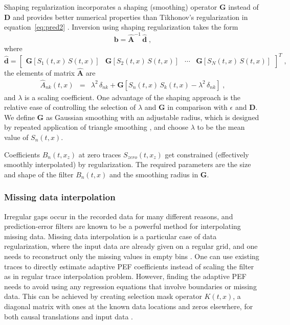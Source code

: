 Shaping regularization \cite[]{Fomel07} incorporates a shaping
(smoothing) operator $\mathbf{G}$ instead of $\mathbf{D}$ and
provides better numerical properties than Tikhonov's
regularization \cite[]{Tikhonov63} in
equation~\ref{eq:pred2} \cite[]{Fomel09}.
Inversion using shaping regularization takes the form
\begin{equation}
  \label{eq:rinv}
  \mathbf{b} = \widehat{\mathbf{A}}^{-1}\,\widehat{\mathbf{d}}\;,
\end{equation}
where 
\begin{equation}
  \label{eq:dvar2}
\widehat{\mathbf{d}} = \left[\begin{array}{cccc}\mathbf{G}\left[S_1(t,x)\,S(t,x)\right] & 
\mathbf{G}\left[S_2(t,x)\,S(t,x)\right] & \cdots & 
\mathbf{G}\left[S_N(t,x)\,S(t,x)\right]\end{array}\right]^T\;,
\end{equation}
the elements of matrix $\widehat{\mathbf{A}}$ are
\begin{eqnarray}
  \label{eq:raij}
  \widehat{A}_{nk}(t,x) &=& \lambda^2\,\delta_{nk} + \mathbf{G}\left[S_n(t,x)\,S_k(t,x) - 
    \lambda^2\,\delta_{nk}\right]\;,
\end{eqnarray}
and $\lambda$ is a scaling coefficient. One advantage of the shaping
approach is the relative ease of controlling the selection of
$\lambda$ and $\mathbf{G}$ in comparison with $\epsilon$ and
$\mathbf{D}$. We define $\mathbf{G}$ as Gaussian smoothing with an
adjustable radius, which is designed by repeated application of
triangle smoothing \cite[]{Fomel07}, and choose $\lambda$ to be the
mean value of $S_n(t,x)$.

Coefficients $B_n(t,x_z)$ at zero traces $S_{zero}(t,x_z)$ get constrained
(effectively smoothly interpolated) by regularization. The required
parameters are the size and shape of the filter $B_n(t,x)$ and the
smoothing radius in $\mathbf{G}$.

\subsubsection{Missing data interpolation} 

Irregular gaps occur in the recorded data for many different reasons,
and prediction-error filters are known to be a powerful method for
interpolating missing data. Missing data interpolation is a particular
case of data regularization, where the input data are already given on
a regular grid, and one needs to reconstruct only the missing values
in empty bins \cite[]{Fomel01a}. One can use existing traces to
directly estimate adaptive PEF coefficients instead of scaling the
filter as in regular trace interpolation problem. However, finding the
adaptive PEF needs to avoid using any regression equations that
involve boundaries or missing data. This can be achieved by creating
selection mask operator $K(t,x)$, a diagonal matrix with ones at the
known data locations and zeros elsewhere, for both causal translations
and input data \cite[]{Claerbout10}.

